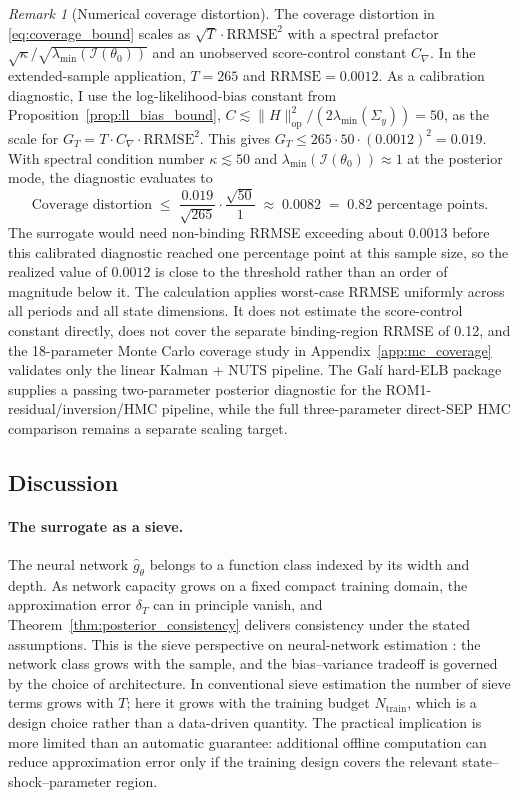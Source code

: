 \documentclass[12pt]{article}
\theoremstyle{plain}
\theoremstyle{definition}
\theoremstyle{remark}
\newtheorem{remark}[theorem]{Remark}
\newcommand{\Sigmay}{\Sigma_y}
\begin{document}
\begin{remark}[Numerical coverage distortion]
\label{rem:rrmse_scaling}
The coverage distortion in \eqref{eq:coverage_bound} scales as $\sqrt{T} \cdot \text{RRMSE}^2$ with a spectral prefactor $\sqrt{\kappa}/\sqrt{\lambda_{\min}(\mathcal{I}(\theta_0))}$ and an unobserved score-control constant $C_\nabla$. In the extended-sample application, $T = 265$ and $\text{RRMSE} = 0.0012$. As a calibration diagnostic, I use the log-likelihood-bias constant from Proposition~\ref{prop:ll_bias_bound}, $C \lesssim \|H\|_{\text{op}}^2 / (2\lambda_{\min}(\Sigmay)) = 50$, as the scale for $G_T = T \cdot C_\nabla \cdot \text{RRMSE}^2$. This gives $G_T \leq 265 \cdot 50 \cdot (0.0012)^2 = 0.019$. With spectral condition number $\kappa \lesssim 50$ and $\lambda_{\min}(\mathcal{I}(\theta_0)) \approx 1$ at the posterior mode, the diagnostic evaluates to
\[
\text{Coverage distortion}
  \;\leq\; \frac{0.019}{\sqrt{265}} \cdot \frac{\sqrt{50}}{1}
  \;\approx\; 0.0082 \;=\; 0.82 \text{ percentage points}.
\]
The surrogate would need non-binding RRMSE exceeding about $0.0013$ before this calibrated diagnostic reached one percentage point at this sample size, so the realized value of $0.0012$ is close to the threshold rather than an order of magnitude below it. The calculation applies worst-case RRMSE uniformly across all periods and all state dimensions. It does not estimate the score-control constant directly, does not cover the separate binding-region RRMSE of 0.12, and the 18-parameter Monte Carlo coverage study in Appendix~\ref{app:mc_coverage} validates only the linear Kalman + NUTS pipeline. The Gal\'i hard-ELB package supplies a passing two-parameter posterior diagnostic for the ROM1-residual/inversion/HMC pipeline, while the full three-parameter direct-SEP HMC comparison remains a separate scaling target.
\end{remark}

\subsection{Discussion}

\paragraph{The surrogate as a sieve.}
The neural network $\hat{g}_\theta$ belongs to a function class indexed by its width and depth. As network capacity grows on a fixed compact training domain, the approximation error $\delta_T$ can in principle vanish, and Theorem~\ref{thm:posterior_consistency} delivers consistency under the stated assumptions. This is the sieve perspective on neural-network estimation \citep{chen2007large}: the network class grows with the sample, and the bias--variance tradeoff is governed by the choice of architecture. In conventional sieve estimation the number of sieve terms grows with $T$; here it grows with the training budget $N_{\text{train}}$, which is a design choice rather than a data-driven quantity. The practical implication is more limited than an automatic guarantee: additional offline computation can reduce approximation error only if the training design covers the relevant state--shock--parameter region.
\end{document}
